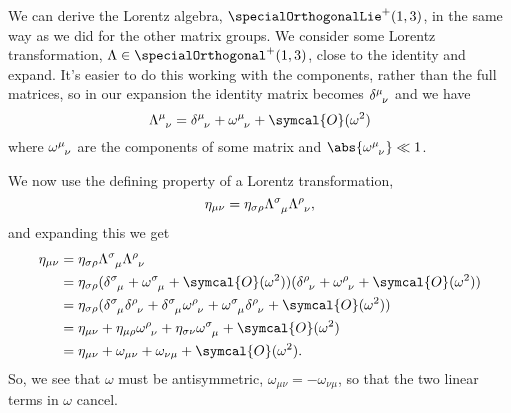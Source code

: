 \documentclass[fleqn]{NotesClass}
\newcommand{\minkowskiMetric}{\eta}
\newcommand{\order}{\symcal{O}}
\begin{document}
    We can derive the Lorentz algebra, \(\specialOrthogonalLie^+(1, 3)\), in the same way as we did for the other matrix groups.
    We consider some Lorentz transformation, \(\Lambda \in \specialOrthogonal^+(1, 3)\), close to the identity and expand.
    It's easier to do this working with the components, rather than the full matrices, so in our expansion the identity matrix becomes \(\tensor{\delta}{^\mu_\nu}\) and we have
    \begin{equation}
        \tensor{\Lambda}{^\mu_\nu} = \tensor{\delta}{^\mu_\nu} + \tensor{\omega}{^\mu_\nu} + \order(\omega^2)
    \end{equation}
    where \(\tensor{\omega}{^\mu_\nu}\) are the components of some matrix and \(\abs{\tensor{\omega}{^\mu_\nu}} \ll 1\).
    
    We now use the defining property of a Lorentz transformation,
    \begin{equation}
        \minkowskiMetric_{\mu\nu} = \minkowskiMetric_{\sigma\rho} \tensor{\Lambda}{^\sigma_\mu} \tensor{\Lambda}{^\rho_\nu},
    \end{equation}
    and expanding this we get
    \begin{align}
        \minkowskiMetric_{\mu\nu} &= \minkowskiMetric_{\sigma\rho} \tensor{\Lambda}{^\sigma_\mu} \tensor{\Lambda}{^\rho_\nu}\\
        &= \minkowskiMetric_{\sigma\rho}(\tensor{\delta}{^\sigma_\mu} + \tensor{\omega}{^\sigma_\mu} + \order(\omega^2)) (\tensor{\delta}{^\rho_\nu} + \tensor{\omega}{^\rho_\nu} + \order(\omega^2))\\
        &= \minkowskiMetric_{\sigma\rho}(\tensor{\delta}{^\sigma_\mu}\tensor{\delta}{^\rho_\nu} + \tensor{\delta}{^\sigma_\mu} \tensor{\omega}{^\rho_\nu} + \tensor{\omega}{^\sigma_\mu}\tensor{\delta}{^\rho_\nu} + \order(\omega^2))\\
        &= \minkowskiMetric_{\mu\nu} + \minkowskiMetric_{\mu\rho}\tensor{\omega}{^\rho_\nu} + \minkowskiMetric_{\sigma\nu}\tensor{\omega}{^\sigma_\mu} + \order(\omega^2)\\
        &= \minkowskiMetric_{\mu\nu} + \omega_{\mu\nu} + \omega_{\nu\mu} +\order(\omega^2).
    \end{align}
    So, we see that \(\omega\) must be antisymmetric, \(\omega_{\mu\nu} = -\omega_{\nu\mu}\), so that the two linear terms in \(\omega\) cancel.
    
\end{document}
